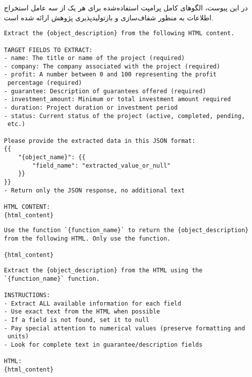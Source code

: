 \label{appendix:prompts}

در این پیوست، الگوهای کامل پرامپت استفاده‌شده برای هر یک از سه عامل استخراج اطلاعات به منظور شفاف‌سازی و بازتولیدپذیری پژوهش ارائه شده است.

\begin{latin}
\begin{tcolorbox}[colback=black!5!white,colframe=black!75!black,title=Basic Agent Prompt]
\begin{verbatim}
Extract the {object_description} from the following HTML content.

TARGET FIELDS TO EXTRACT:
- name: The title or name of the project (required)
- company: The company associated with the project (required)
- profit: A number between 0 and 100 representing the profit
 percentage (required)
- guarantee: Description of guarantees offered (required)
- investment_amount: Minimum or total investment amount required
- duration: Project duration or investment period
- status: Current status of the project (active, completed, pending,
 etc.)

Please provide the extracted data in this JSON format:
{{
    "{object_name}": {{
        "field_name": "extracted_value_or_null"
    }}
}}
- Return only the JSON response, no additional text

HTML CONTENT:
{html_content}
\end{verbatim}
\end{tcolorbox}
\end{latin}

\begin{latin}
\begin{tcolorbox}[colback=black!5!white,colframe=black!75!black,title=Function-oriented Agent Prompt]
\begin{verbatim}
Use the function `{function_name}` to return the {object_description} 
from the following HTML. Only use the function.

{html_content}
\end{verbatim}
\end{tcolorbox}
\end{latin}

\begin{latin}
\begin{tcolorbox}[colback=black!5!white,colframe=black!75!black,title=Expert Agent: Round 1 (Comprehensive Extraction)]
\begin{verbatim}
Extract the {object_description} from the HTML using the 
`{function_name}` function.

INSTRUCTIONS:
- Extract ALL available information for each field
- Use exact text from the HTML when possible
- If a field is not found, set it to null
- Pay special attention to numerical values (preserve formatting and
 units)
- Look for complete text in guarantee/description fields

HTML:
{html_content}
\end{verbatim}
\end{tcolorbox}
\end{latin}

